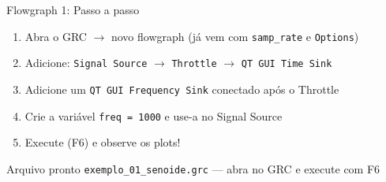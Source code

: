\documentclass[aspectratio=169]{beamer}
\begin{document}
\begin{frame}{Flowgraph 1: Passo a passo}
\begin{enumerate}
  \item Abra o GRC $\rightarrow$ novo flowgraph (j\'{a} vem com \texttt{samp\_rate} e \texttt{Options})
  \item Adicione: \texttt{Signal Source} $\rightarrow$ \texttt{Throttle} $\rightarrow$ \texttt{QT GUI Time Sink}
  \item Adicione um \texttt{QT GUI Frequency Sink} conectado ap\'{o}s o Throttle
  \item Crie a vari\'{a}vel \texttt{freq = 1000} e use-a no Signal Source
  \item \alert{Execute} (F6) e observe os plots!
\end{enumerate}

\vspace{0.3cm}

\begin{exampleblock}{Arquivo pronto}
\texttt{exemplo\_01\_senoide.grc} --- abra no GRC e execute com F6
\end{exampleblock}
\end{frame}
\end{document}

